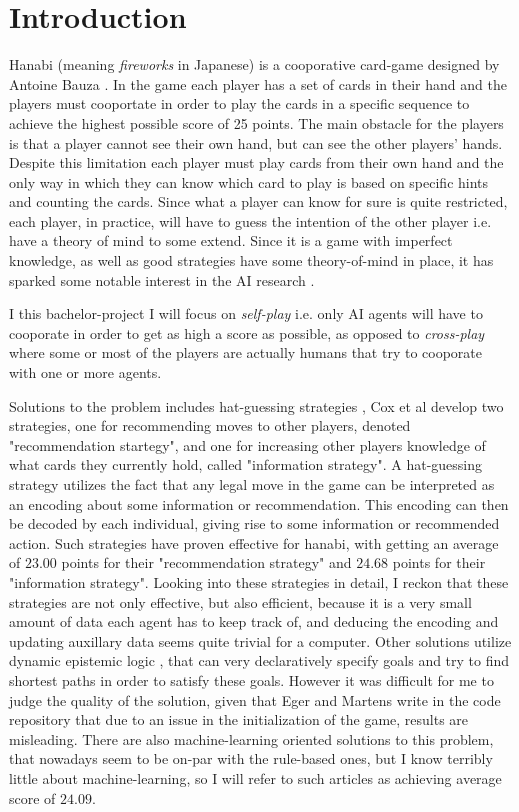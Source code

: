 \section{Introduction}

Hanabi (meaning \emph{fireworks} in Japanese) is a cooporative card-game designed by Antoine Bauza \cite{BGGHanabi}. 
In the game each player has a set of cards in their hand and the players must cooportate in order to play the cards in a specific sequence to achieve the highest possible score of 25 points.
The main obstacle for the players is that a player cannot see their own hand, but can see the other players' hands. 
Despite this limitation each player must play cards from their own hand and the only way in which they can know which card to play is based on specific hints and counting the cards. 
Since what a player can know for sure is quite restricted, each player, in practice, will have to guess the intention of the other player i.e. have a theory of mind to some extend. 
Since it is a game with imperfect knowledge, as well as good strategies have some theory-of-mind in place, it has sparked some notable interest in the AI research \cite{DeepmindAndOthers}. 

I this bachelor-project I will focus on \emph{self-play} i.e. only AI agents will have to cooporate in order to get as high a score as possible, as opposed to \emph{cross-play} where some or most of the players are actually humans that try to cooporate with one or more agents.  

Solutions to the problem includes hat-guessing strategies \cite{CoxEtAl2015}, Cox et al develop two strategies, one for recommending moves to other players, denoted "recommendation startegy", and one for increasing other players knowledge of what cards they currently hold, called "information strategy". 
A hat-guessing strategy utilizes the fact that any legal move in the game can be interpreted as an encoding about some information or recommendation.
This encoding can then be decoded by each individual, giving rise to some information or recommended action. 
Such strategies have proven effective for hanabi, with \cite{CoxEtAl2015} getting an average of $23.00$ points for their "recommendation strategy" and $24.68$ points for their "information strategy". 
Looking into these strategies in detail, I reckon that these strategies are not only effective, but also efficient, because it is a very small amount of data each agent has to keep track of, and deducing the encoding and updating auxillary data seems quite trivial for a computer.
Other solutions utilize dynamic epistemic logic \cite{EgerM17}, that can very declaratively specify goals and try to find shortest paths in order to satisfy these goals. However it was difficult for me to judge the quality of the solution, given that Eger and Martens write in the code repository \cite{Ostari} that due to an issue in the initialization of the game, results are misleading. 
There are also machine-learning oriented solutions to this problem, that nowadays seem to be on-par with the rule-based ones, but I know terribly little about machine-learning, so I will refer to such articles as \cite{hu2021otherplay} achieving average score of $24.09$.

